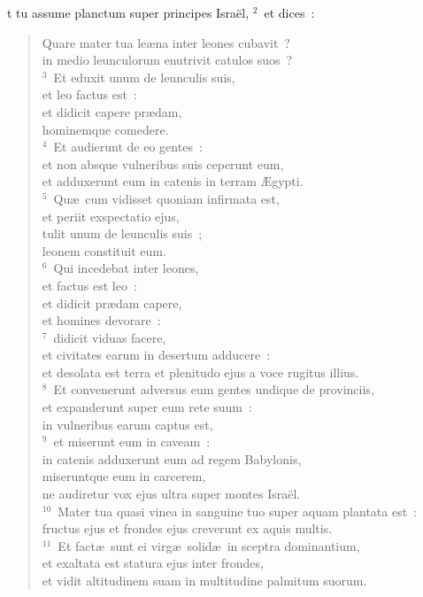\bchapter
{}t tu assume planctum super principes Isra\"el,
${}^{2}$~et dices~: \begin{flushleft}\begin{verse}Quare mater tua le\ae na inter leones cubavit~?\\ in medio leunculorum enutrivit catulos suos~?\\
${}^{3}$~Et eduxit unum de leunculis suis,\\ et leo factus est~:\\ et didicit capere pr\ae dam,\\ hominemque comedere.\\
${}^{4}$~Et audierunt de eo gentes~:\\ et non absque vulneribus suis ceperunt eum,\\ et adduxerunt eum in catenis in terram \AE gypti.\\
${}^{5}$~Qu\ae\ cum vidisset quoniam infirmata est,\\ et periit exspectatio ejus,\\ tulit unum de leunculis suis~;\\ leonem constituit eum.\\
${}^{6}$~Qui incedebat inter leones,\\ et factus est leo~:\\ et didicit pr\ae dam capere,\\ et homines devorare~:\\
${}^{7}$~didicit viduas facere,\\ et civitates earum in desertum adducere~:\\ et desolata est terra et plenitudo ejus a voce rugitus illius.\\
${}^{8}$~Et convenerunt adversus eum gentes undique de provinciis,\\ et expanderunt super eum rete suum~:\\ in vulneribus earum captus est,\\
${}^{9}$~et miserunt eum in caveam~:\\ in catenis adduxerunt eum ad regem Babylonis,\\ miseruntque eum in carcerem,\\ ne audiretur vox ejus ultra super montes Isra\"el.\\
${}^{10}$~Mater tua quasi vinea in sanguine tuo super aquam plantata est~:\\ fructus ejus et frondes ejus creverunt ex aquis multis.\\
${}^{11}$~Et fact\ae\ sunt ei virg\ae\ solid\ae\ in sceptra dominantium,\\ et exaltata est statura ejus inter frondes,\\ et vidit altitudinem suam in multitudine palmitum suorum.\\

\end{verse}
\end{flushleft}
